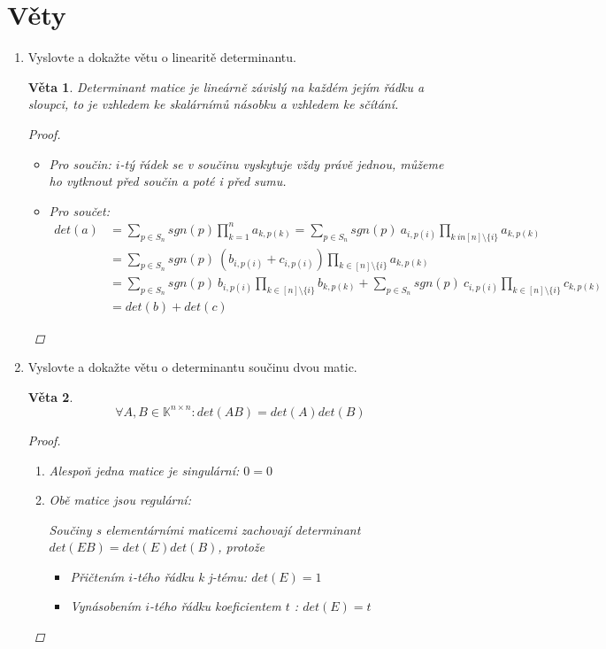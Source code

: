 \documentclass[10pt,a4paper]{article}
\theoremstyle{plain}
\newtheorem{veta}{Věta}
\theoremstyle{definition}
\begin{document}
\part{Věty}
\begin{enumerate}
\item Vyslovte a dokažte větu o linearitě determinantu.

\begin{veta}

Determinant matice je lineárně závislý na každém jejím řádku a sloupci, to je vzhledem ke skalárnímů násobku a vzhledem ke sčítání.

\begin{proof}
\begin{itemize}
\item Pro součin: $i$-tý řádek se v součinu vyskytuje vždy právě jednou, můžeme ho vytknout před součin a poté i před sumu.
\item Pro součet:
\begin{align*}
det(a) &= \sum_{p \in S_n} sgn(p) \prod_{k=1}^n a_{k, p(k)} 
		= \sum_{p \in S_n} sgn(p)\ a_{i,p(i)} \prod_{k\ in [n] \setminus \{i\}} a_{k, p(k)} \\
	   &=  \sum_{p \in S_n} sgn(p)\ (b_{i,p(i)} + c_{i,p(i)}) \prod_{k \in [n] \setminus \{i\}} a_{k, p(k)} \\
	   &=  \sum_{p \in S_n} sgn(p)\ b_{i,p(i)} \prod_{k \in [n] \setminus \{i\}} b_{k, p(k)} + \sum_{p \in S_n} sgn(p)\  c_{i,p(i)} \prod_{k \in [n] \setminus \{i\}} c_{k, p(k)} \\
	   &= det(b) + det(c)
\end{align*}
\end{itemize}
\end{proof}
\end{veta}



\item Vyslovte a dokažte větu o determinantu součinu dvou matic.

\begin{veta}
\[ \forall A,B \in \mathbb{K}^{n \times n}: det(AB) = det(A)det(B) \]
\begin{proof}
\begin{enumerate}[label=(\alph*)]
\item Alespoň jedna matice je singulární: $0 = 0$
\item Obě matice jsou regulární: 

Součiny s elementárními maticemi zachovají determinant $det(EB)=det(E)det(B)$, protože \begin{itemize}
\item Přičtením $i$-tého řádku k j-tému: $det(E) = 1$
\item Vynásobením $i$-tého řádku koeficientem $t$ : $det(E) = t$
\end{itemize}


\end{enumerate}
\end{proof}
\end{veta}
\end{enumerate}
\end{document}
